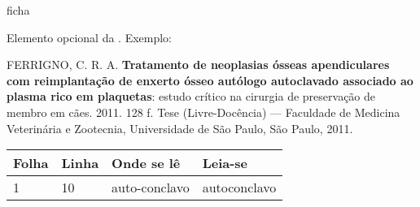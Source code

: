 \frenchspacing                %

\imprimircapa{}
\imprimirfolhaderosto*    %

{ficha}

\begin{errata}
Elemento opcional da . Exemplo:

\vspace{\onelineskip}

FERRIGNO, C. R. A. \textbf{Tratamento de neoplasias ósseas apendiculares com
  reimplantação de enxerto ósseo autólogo autoclavado associado ao plasma
  rico em plaquetas}: estudo crítico na cirurgia de preservação de membro em
cães. 2011. 128 f. Tese (Livre-Docência) --- Faculdade de Medicina Veterinária e
Zootecnia, Universidade de São Paulo, São Paulo, 2011.

\begin{table}[htb]
\center{}
\footnotesize
\begin{tabular}{p{1.4cm}p{1cm}p{3cm}p{3cm}}
\toprule
\textbf{Folha} & \textbf{Linha} & \textbf{Onde se lê} & \textbf{Leia-se} \\
\midrule
1              & 10             & auto-conclavo       & autoconclavo     \\
\bottomrule
\end{tabular}
\end{table}

\end{errata}


